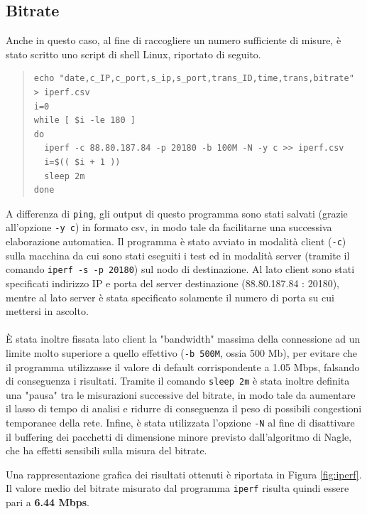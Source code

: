 \documentclass[a4paper,10pt]{article}
\begin{document}
\subsection{Bitrate}
Anche in questo caso, al fine di raccogliere un numero sufficiente di misure, è stato scritto uno script di shell Linux, riportato di seguito.
\small
\begin{quote}
\begin{verbatim}
echo "date,c_IP,c_port,s_ip,s_port,trans_ID,time,trans,bitrate" > iperf.csv
i=0
while [ $i -le 180 ]
do
  iperf -c 88.80.187.84 -p 20180 -b 100M -N -y c >> iperf.csv
  i=$(( $i + 1 ))
  sleep 2m
done
\end{verbatim}
\end{quote}
\normalsize
A differenza di \texttt{ping}, gli output di questo programma sono stati salvati (grazie all'opzione \texttt{-y c}) in formato csv, in modo tale da facilitarne una successiva elaborazione automatica. Il programma è stato avviato in modalità client (\texttt{-c}) sulla macchina da cui sono stati eseguiti i test ed in modalità server (tramite il comando \texttt{iperf -s -p 20180}) sul nodo di destinazione. Al lato client sono stati specificati indirizzo IP e porta del server destinazione (88.80.187.84 : 20180), mentre al lato server è stata specificato solamente il numero di porta su cui mettersi in ascolto.\\\\
È stata inoltre fissata lato client la "bandwidth" massima della connessione ad un limite molto superiore a quello effettivo (\texttt{-b 500M}, ossia 500 Mb), per evitare che il programma utilizzasse il valore di default corrispondente a 1.05 Mbps, falsando di conseguenza i risultati. Tramite il comando \texttt{sleep 2m} è stata inoltre definita una "pausa" tra le misurazioni successive del bitrate, in modo tale da aumentare il lasso di tempo di analisi e ridurre di conseguenza il peso di possibili congestioni temporanee della rete. Infine, è stata utilizzata l'opzione \texttt{-N} al fine di disattivare il buffering dei pacchetti di dimensione minore previsto dall'algoritmo di Nagle, che ha effetti sensibili sulla misura del bitrate.
\newpage

\noindent
Una rappresentazione grafica dei risultati ottenuti è riportata in Figura \ref{fig:iperf}. Il valore medio del bitrate misurato dal programma \texttt{iperf} risulta quindi essere pari a \textbf{6.44 Mbps}.\\
\end{document}
